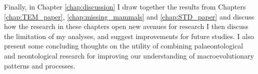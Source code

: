 

Finally, in Chapter \ref{chap:discussion} I draw together the results from Chapters \ref{chap:TEM_paper}, \ref{chap:missing_mammals} and \ref{chap:STD_paper} and discuss how the research in these chapters open new avenues for research %
I then discuss the limitation of my analyses, and suggest improvements for future studies.
I also present some concluding thoughts on the utility of combining palaeontological and neontological research for improving our understanding of macroevolutionary patterns and processes.

%
